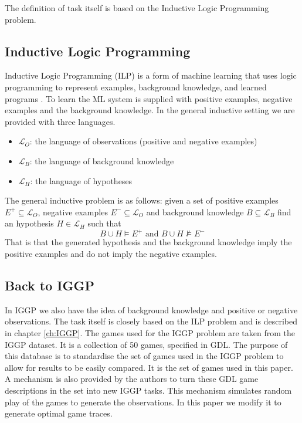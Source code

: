 The definition of task itself is based on the Inductive Logic Programming problem.

\subsection{Inductive Logic Programming}\label{sec:ILP}
Inductive Logic Programming (ILP) is a form of machine learning that uses logic programming to represent examples, background knowledge, and learned programs \cite{Cropper/EfficientLearning}. To learn the ML system is supplied with positive examples, negative examples and the background knowledge. In the general inductive setting we are provided with three languages.
\begin{itemize}
\item $\mathcal{L}_O$: the language of observations (positive and negative examples)
\item $\mathcal{L}_B$: the language of background knowledge
\item $\mathcal{L}_H$: the language of hypotheses
\end{itemize}
The general inductive problem is as follows: given a set of positive examples $E^+ \subseteq \mathcal{L}_O$, negative examples $E^- \subseteq \mathcal{L}_O$ and  background knowledge $B \subseteq \mathcal{L}_B$ find an hypothesis $H \in \mathcal{L}_H$ such that 
\[B \cup H \models E^+ \text{ and } B \cup H \not\models E^-\]
\cite{Muggleton/ILP}
That is that the generated hypothesis and the background knowledge imply the positive examples and do not imply the negative examples.


\subsection{Back to IGGP}

In IGGP we also have the idea of background knowledge and positive or negative observations. The task itself is closely based on the ILP problem and is described in chapter \ref{ch:IGGP}. The games used for the IGGP problem are taken from the IGGP dataset. It is a collection of 50 games, specified in GDL. The purpose of this database is to standardise the set of games used in the IGGP problem to allow for results to be easily compared. It is the set of games used in this paper.
A mechanism is also provided by the authors to turn these GDL game descriptions in the set into new IGGP tasks. This mechanism simulates random play of the games to generate the observations. In this paper we modify it to generate optimal game traces.


